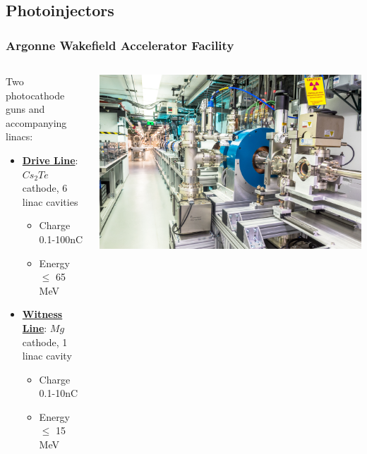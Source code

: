 \documentclass[professionalfonts,t]{beamer}
\begin{document}
\subsection{Photoinjectors}
\begin{frame}[t]
\frametitle{Argonne Wakefield Accelerator Facility}
\vspace{1em}
\begin{columns}[T] %
	\begin{column}{.48\textwidth}
					Two photocathode guns and accompanying linacs:
			\begin{itemize}
				\item{\underline{\textbf{Drive Line}}: $Cs_2Te$ cathode, 6 linac cavities}
				\begin{itemize}
					\item{Charge 0.1-100nC}
					\item{Energy $\leq$ 65 MeV}
					
				\end{itemize}
				\item{\underline{\textbf{Witness Line}}: $Mg$ cathode, 1 linac cavity}
				\begin{itemize}
					\item{Charge 0.1-10nC}
					\item{Energy $\leq$ 15 MeV}
				\end{itemize}
			\end{itemize}
	\end{column}%
	\hfill%
	\begin{column}{.5\textwidth}
		\vspace{1em}
		\includegraphics[width=1.0\linewidth, right]{../images/drive_gun}
	\end{column}%
\end{columns}
\end{frame}
\end{document}
